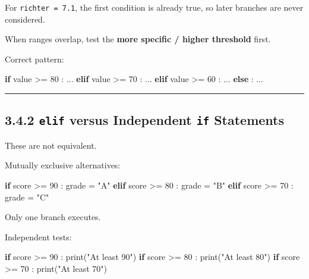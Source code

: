 \documentclass[
  11pt,
  a4paper,
]{article}
\newenvironment{Shaded}{}{}
\newcommand{\BuiltInTok}[1]{\textcolor[rgb]{0.00,0.50,0.00}{#1}}
\newcommand{\ControlFlowTok}[1]{\textcolor[rgb]{0.00,0.44,0.13}{\textbf{#1}}}
\newcommand{\DecValTok}[1]{\textcolor[rgb]{0.25,0.63,0.44}{#1}}
\newcommand{\NormalTok}[1]{#1}
\newcommand{\OperatorTok}[1]{\textcolor[rgb]{0.40,0.40,0.40}{#1}}
\newcommand{\StringTok}[1]{\textcolor[rgb]{0.25,0.44,0.63}{#1}}
\begin{document}
For \texttt{richter\ =\ 7.1}, the first condition is already true, so
later branches are never considered.

When ranges overlap, test the \textbf{more specific / higher threshold}
first.

Correct pattern:

\begin{Shaded}
\begin{Highlighting}[]
\ControlFlowTok{if}\NormalTok{ value }\OperatorTok{\textgreater{}=} \DecValTok{80}\NormalTok{ :}
\NormalTok{    ...}
\ControlFlowTok{elif}\NormalTok{ value }\OperatorTok{\textgreater{}=} \DecValTok{70}\NormalTok{ :}
\NormalTok{    ...}
\ControlFlowTok{elif}\NormalTok{ value }\OperatorTok{\textgreater{}=} \DecValTok{60}\NormalTok{ :}
\NormalTok{    ...}
\ControlFlowTok{else}\NormalTok{ :}
\NormalTok{    ...}
\end{Highlighting}
\end{Shaded}

\begin{center}\rule{0.5\linewidth}{0.5pt}\end{center}

\subsection{\texorpdfstring{3.4.2 \texttt{elif} versus Independent
\texttt{if}
Statements}{3.4.2 elif versus Independent if Statements}}\label{elif-versus-independent-if-statements}

These are not equivalent.

Mutually exclusive alternatives:

\begin{Shaded}
\begin{Highlighting}[]
\ControlFlowTok{if}\NormalTok{ score }\OperatorTok{\textgreater{}=} \DecValTok{90}\NormalTok{ :}
\NormalTok{    grade }\OperatorTok{=} \StringTok{"A"}
\ControlFlowTok{elif}\NormalTok{ score }\OperatorTok{\textgreater{}=} \DecValTok{80}\NormalTok{ :}
\NormalTok{    grade }\OperatorTok{=} \StringTok{"B"}
\ControlFlowTok{elif}\NormalTok{ score }\OperatorTok{\textgreater{}=} \DecValTok{70}\NormalTok{ :}
\NormalTok{    grade }\OperatorTok{=} \StringTok{"C"}
\end{Highlighting}
\end{Shaded}

Only one branch executes.

Independent tests:

\begin{Shaded}
\begin{Highlighting}[]
\ControlFlowTok{if}\NormalTok{ score }\OperatorTok{\textgreater{}=} \DecValTok{90}\NormalTok{ :}
    \BuiltInTok{print}\NormalTok{(}\StringTok{"At least 90"}\NormalTok{)}
\ControlFlowTok{if}\NormalTok{ score }\OperatorTok{\textgreater{}=} \DecValTok{80}\NormalTok{ :}
    \BuiltInTok{print}\NormalTok{(}\StringTok{"At least 80"}\NormalTok{)}
\ControlFlowTok{if}\NormalTok{ score }\OperatorTok{\textgreater{}=} \DecValTok{70}\NormalTok{ :}
    \BuiltInTok{print}\NormalTok{(}\StringTok{"At least 70"}\NormalTok{)}
\end{Highlighting}
\end{Shaded}
\end{document}
